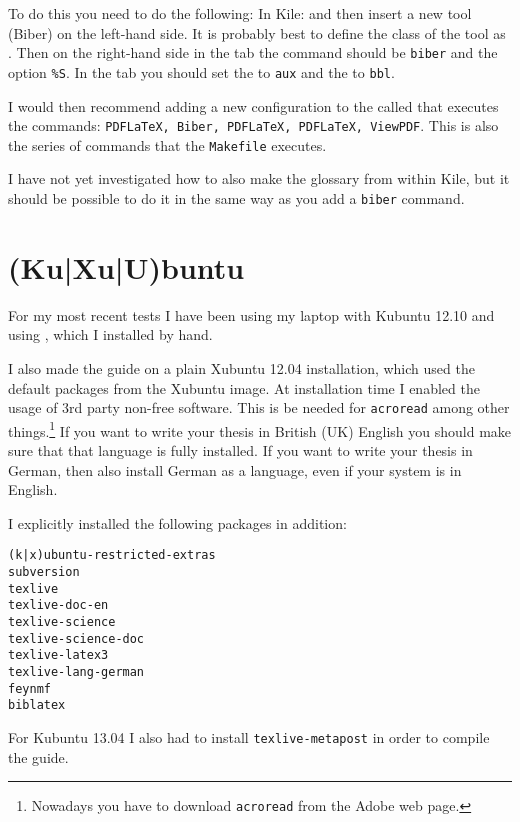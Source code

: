 To do this you need to do the following:
In Kile:  and
then insert a new tool (Biber) on the left-hand side. It is probably
best to define the class of the tool as \BibTeX. Then on the
right-hand side in the  tab the command should be
\texttt{biber} and the option \texttt{\%S}. In the 
tab you should set the  to \texttt{aux} and
the  to \texttt{bbl}.

I would then recommend adding a new configuration to the
 called  that
executes the commands: \texttt{PDFLaTeX, Biber, PDFLaTeX, PDFLaTeX,
  ViewPDF}. This is also the series of commands that the
\texttt{Makefile} executes.

I have not yet investigated how to also make the glossary from within
Kile, but it should be possible to do it in the same way as you add a
\texttt{biber} command.


\section{(Ku|Xu|U)buntu}
\label{sec:app:kubuntu}

For my most recent tests I have been using my laptop with Kubuntu 12.10
and using , which I installed by hand.

I also made the guide on a plain Xubuntu 12.04
installation, which used the default packages from the Xubuntu image. At
installation time I enabled the usage of 3rd party non-free
software. This is be needed for \texttt{acroread} among other
things.\footnote{Nowadays you have to download \texttt{acroread} from
  the Adobe web page.} If
you want to write your thesis in British (UK) English you should make sure
that that language is fully installed. If you want to write your
thesis in German, then also install German as a language, even if
your system is in English.

I explicitly installed the following packages in addition:
\begin{verbatim}
(k|x)ubuntu-restricted-extras
subversion
texlive
texlive-doc-en
texlive-science
texlive-science-doc
texlive-latex3
texlive-lang-german
feynmf
biblatex
\end{verbatim}
For Kubuntu 13.04 I also had to install \texttt{texlive-metapost} in
order to compile the guide.

